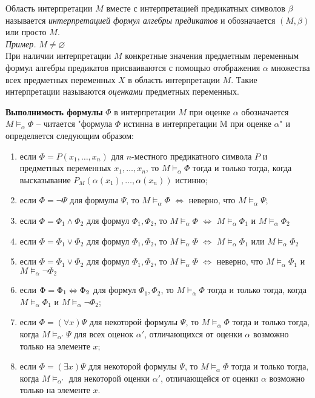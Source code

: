Область интерпретации $M$ вместе с интерпретацией предикатных символов $\beta$ называется {\it интерпретацией формул алгебры предикатов} и обозначается $(M, \beta)$ или просто $M$. \\
{\it Пример. }$M \neq \varnothing$ \\

При наличии интерпретации $M$ конкретные значения предметным переменным формул алгебры предикатов присваиваются с помощью отображения $\alpha$ множества всех предметных переменных $X$ в область интерпретации $M$. Такие интерпретации называются {\it оценками} предметных переменных.

\dftion \textbf{Выполнимость формулы} $\Phi$ в интерпретации $M$ при оценке $\alpha$ обозначается $M \vDash_\alpha \Phi$ -- читается "формула $\Phi$ истинна в интерпретации M при оценке $\alpha$" и определяется следующим образом:
\begin{enumerate}
    \item если $\Phi = P(x_1, \dots, x_n)$ для $n$-местного предикатного символа $P$ и предметных переменных $x_1, \dots, x_n$, то $M \vDash_\alpha \Phi$ тогда и только тогда, когда высказывание $P_M(\alpha(x_1),\dots,\alpha(x_n))$ истинно;
    \item если $\Phi = \neg \Psi$ для формулы $\Psi$, то $M \vDash_\alpha \Phi$ $\Leftrightarrow$ неверно, что $M \vDash_\alpha \Psi$;
    \item если $\Phi = \Phi_1 \land \Phi_2$ для формул $\Phi_1, \Phi_2$, то $M \vDash_\alpha \Phi$ $\Leftrightarrow$ $M \vDash_\alpha \Phi_1$ и $M \vDash_\alpha \Phi_2$
    \item если $\Phi = \Phi_1 \lor \Phi_2$ для формул $\Phi_1, \Phi_2$, то $M \vDash_\alpha \Phi$ $\Leftrightarrow$ $M \vDash_\alpha \Phi_1$ или $M \vDash_\alpha \Phi_2$
    \item если $\Phi = \Phi_1 \lor \Phi_2$ для формул $\Phi_1, \Phi_2$, то $M \vDash_\alpha \Phi$ $\Leftrightarrow$ неверно, что $M \vDash_\alpha \Phi_1$ и $M \vDash_\alpha \neg \Phi_2$
    \item если $\Phi = \Phi_1 \Leftrightarrow \Phi_2$ для формул $\Phi_1, \Phi_2$, то $M \vDash_\alpha \Phi$ тогда и только тогда, когда $M \vDash_\alpha \Phi_1$ и $M \vDash_\alpha \lnot \Phi_2$;
    \item если $\Phi = (\forall x)\Psi$ для некоторой формулы $\Psi$, то $M \vDash_\alpha \Phi$ тогда и только тогда, когда $M \vDash_{\alpha'} \Psi$ для всех оценок $\alpha'$, отличающихся от оценки $\alpha$ возможно только на элементе $x$;
    \item если $\Phi = (\exists x)\Psi$ для некоторой формулы $\Psi$, то $M \vDash_\alpha \Phi$ тогда и только тогда, когда $M \vDash_{\alpha'}$ для некоторой оценки $\alpha'$, отличающейся от оценки $\alpha$ возможно только на элементе $x$.
\end{enumerate}